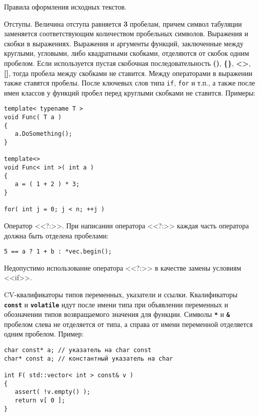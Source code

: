\documentclass{article}
\begin{document}
\begin{center}
\Huge Правила оформления исходных текстов.
\end{center}

\Large Отступы.
\normalsize
\vskip0.5cm
Величина отступа равняется \textbf{3} пробелам, причем символ табуляции заменяется соответствующим количеством пробельных символов.
\vskip0.5cm
\Large Выражения и скобки в выражениях.
\normalsize
\vskip0.5cm
Выражения и аргументы функций, заключенные между круглыми, угловыми, либо квадратными скобками, отделяются от скобок одним пробелом. Если используется пустая скобочная последовательность \textbf{()}, \textbf{\{\}}, \textbf{<>}, \textbf{[]}, тогда пробела между скобками не ставится. Между операторами в выражении также ставятся пробелы. После ключевых слов типа \texttt{if}, \texttt{for} и т.п., а также после имен классов у функций пробел перед круглыми скобками не ставится. Примеры:
\begin{lstlisting}
template< typename T >
void Func( T a )
{
   a.DoSomething();
}

template<>
void Func< int >( int a )
{
   a = ( 1 + 2 ) * 3;
}

for( int j = 0; j < n; ++j )
\end{lstlisting}
\vskip0.5cm

\Large Оператор <<?:>>.
\normalsize
\vskip0.5cm
При написании оператора <<?:>> каждая часть оператора должна быть отделена пробелами:
\begin{lstlisting}
5 == a ? 1 + b : *vec.begin();
\end{lstlisting}
\color{red}Недопустимо использование оператора <<?:>> в качестве замены условиям <<if>>.
\color{black}

\vskip0.5cm

\Large CV-квалификаторы типов переменных, указатели и ссылки.
\normalsize
\vskip0.5cm
Квалификаторы \texttt{\textbf{const}} и \texttt{\textbf{volatile}} идут после имени типа при объявлении переменных и обозначении типов возвращаемого значения для функции. Символы \texttt{\textbf{*}} и \texttt{\textbf{\&}} пробелом слева не отделяется от типа, а справа от имени переменной отделяется одним пробелом. Пример:
\begin{lstlisting}
char const* a; // указатель на char const
char* const a; // константный указатель на char

int F( std::vector< int > const& v )
{
   assert( !v.empty() );
   return v[ 0 ];
}
\end{lstlisting}
\vskip0.5cm
\end{document}
